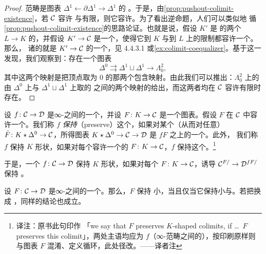 \begin{proof}
\trCoequalizer{}范畴是图表 $\Delta^1 \leftarrow \partial\Delta^1 \to \Delta^1$ 的%
\trPushout{}。于是，由\cref{prop:pushout-colimit-existence}，若 $\mathcal{C}$ 容许%
\trPushout{}与有限\trCoproduct{}，则它容许\trCoequalizer{}。为了看出逆命题，人们可以类似地
循\cref{prop:pushout-colimit-existence}的思路论证。也就是说，假设 $K'$ 是%
\trSimplicialSets{}的两个\trMorphism{} $L \to K$ 的\trCoequalizer{}，并假设 $K' \to \mathcal{C}$
是一个\trFunctor{}，使得它到 $K$ 与到 $L$ 上的限制都容许一个\trColimit{}。那么，
诸\trColimit{}的\trCoequalizer{}就是\trFunctor{} $K' \to \mathcal{C}$ 的一个\trColimit{}，见
\cite{Lur09} 4.4.3.1 或\cref{ex:colimit-coequalizer}。基于这一发现，我们观察到：存在一个\trCoequalizer{}图表
\[
\Delta^0 \rightrightarrows \Delta^1 \sqcup \Delta^1
  \longrightarrow \Lambda^2_0,
\]
其中这两个映射是把顶点取为 $0$ 的那两个包含映射。由此我们可以推出：$\Lambda^2_0$
上的\trColimit{}由 $\Delta^0$ 上与 $\Delta^1 \sqcup \Delta^1$ 上取的\trColimit{}%
之间的两个映射的\trCoequalizer{}给出，而这两者均在 $\mathcal{C}$ 容许有限\trCoproduct{}时存在。
\end{proof}

\begin{definition}\label{def:preserve-colimit}
设 $f\colon \mathcal{C} \to \mathcal{D}$ 是∞-\trCategories{}之间的一个\trFunctor{}，并设
$F\colon K \to \mathcal{C}$ 是一个图表。假设 $F$ 在 $\mathcal{C}$ 中容许一个\trColimit{}。我们称
$f$ \emph{保持}（preserve）这个\trColimit{}，如果对某个（从而对任意）\trColimit{}\trCone{}%
$\bar{F}\colon K \star \Delta^0 \to \mathcal{C}$，所得图表
$K \star \Delta^0 \to \mathcal{C} \to \mathcal{D}$ 是 $fF$ 之上的一个\trColimit{}\trCone{}。此外，
我们称 $f$ 保持 $K$ 形状\trColimit{}，如果对每个容许一个\trColimit{}的\trFunctor{}%
$F\colon K \to \mathcal{C}$，$f$ 保持这个\trColimit{}。\footnote{译注：原书此句印作
「we say that $F$ preserves $K$-shaped colimits, if \ldots\ $F$ preserves this
colimit」，两处主语均应为 $f$（∞-范畴之间的\trFunctor{}），按印刷原样则与图表
$F$ 混淆、定义循环，此处径改。——译者注}
\end{definition}

\begin{remark}\label{rem:preserve-initial-objects}
于是，一个\trFunctor{} $f\colon \mathcal{C} \to \mathcal{D}$ 保持 $K$ 形状\trColimit{}，如果对每个%
\trFunctor{} $F\colon K \to \mathcal{C}$，诱导\trFunctor{} $\mathcal{C}^{F/} \to \mathcal{D}^{fF/}$ 保持%
\trInitialObject{}。
\end{remark}

\begin{proposition}\label{prop:preserve-small-colimits}
设 $F\colon \mathcal{C} \to \mathcal{D}$ 是∞-\trCategories{}之间的一个\trFunctor{}。那么，$F$ 保持
小\trColimit{}，当且仅当它保持小\trCoproduct{}与\trPushout{}。若把\trPushout{}换成%
\trCoequalizer{}，同样的结论也成立。
\end{proposition}

